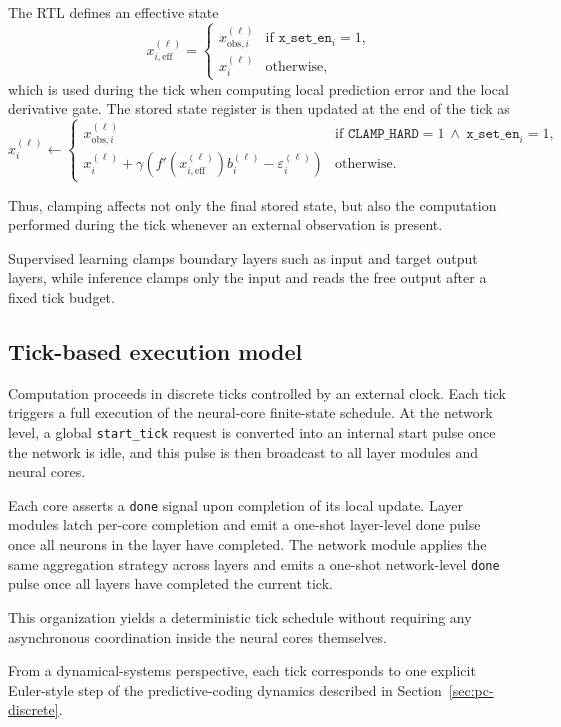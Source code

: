 \documentclass{article}
\begin{document}
The RTL defines an effective state
\[
x_{i,\mathrm{eff}}^{(\ell)} =
\begin{cases}
x^{(\ell)}_{\mathrm{obs},i} & \text{if } \texttt{x\_set\_en}_i = 1, \\
x_i^{(\ell)} & \text{otherwise},
\end{cases}
\]
which is used during the tick when computing local prediction error and the local derivative gate. The stored state register is then updated at the end of the tick as
\[
x_i^{(\ell)} \leftarrow
\begin{cases}
x^{(\ell)}_{\mathrm{obs},i}
& \text{if } \texttt{CLAMP\_HARD}=1 \ \land\ \texttt{x\_set\_en}_i = 1, \\
x_i^{(\ell)} + \gamma \left( f'\!\left(x_{i,\mathrm{eff}}^{(\ell)}\right)b_i^{(\ell)} - \varepsilon_i^{(\ell)} \right)
& \text{otherwise}.
\end{cases}
\]

Thus, clamping affects not only the final stored state, but also the computation performed during the tick whenever an external observation is present.

Supervised learning clamps boundary layers such as input and target output layers, while inference clamps only the input and reads the free output after a fixed tick budget.

\subsection{Tick-based execution model}

Computation proceeds in discrete ticks controlled by an external clock.
Each tick triggers a full execution of the neural-core finite-state schedule.
At the network level, a global \texttt{start\_tick} request is converted into
an internal start pulse once the network is idle, and this pulse is then
broadcast to all layer modules and neural cores.

Each core asserts a \texttt{done} signal upon completion of its local update.
Layer modules latch per-core completion and emit a one-shot layer-level done
pulse once all neurons in the layer have completed. The network module applies
the same aggregation strategy across layers and emits a one-shot network-level
\texttt{done} pulse once all layers have completed the current tick.

This organization yields a deterministic tick schedule without requiring any
asynchronous coordination inside the neural cores themselves.

From a dynamical-systems perspective, each tick corresponds to one explicit
Euler-style step of the predictive-coding dynamics described in
Section~\ref{sec:pc-discrete}.
\end{document}
